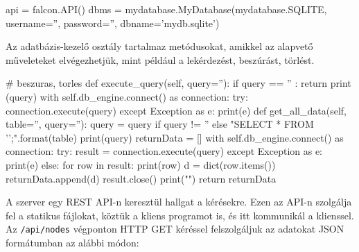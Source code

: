 \begin{python}
api = falcon.API()
dbms = mydatabase.MyDatabase(mydatabase.SQLITE, username='', password='', 
dbname='mydb.sqlite')
\end{python}

Az adatbázis-kezelő osztály tartalmaz metódusokat, amikkel az alapvető műveleteket elvégezhetjük, mint például a lekérdezést, beszúrást, törlést.

\begin{python}
# beszuras, torles
    def execute_query(self, query=''):
            if query == '' : return
            print (query)
            with self.db_engine.connect() as connection:
                try:
                    connection.execute(query)
                except Exception as e:
                    print(e)
def get_all_data(self, table='', query=''):
            query = query if query != '' else "SELECT * 
FROM '{}';".format(table)
            print(query)
            returnData = []
            with self.db_engine.connect() as connection:
                try:
                    result = connection.execute(query)
                except Exception as e:
                    print(e)
                else:   
                    for row in result:
                        print(row)
                        d = dict(row.items())
                        returnData.append(d)
                    result.close()
            print("\n")       
            return returnData
\end{python}

A szerver egy REST API-n keresztül hallgat a kérésekre. Ezen az API-n szolgálja fel a statikus fájlokat, köztük a kliens programot is, és itt kommunikál a klienssel. Az \texttt{/api/nodes} végponton HTTP GET kéréssel felszolgáljuk az adatokat JSON formátumban az alábbi módon:

\begin{json}
\end{json}

